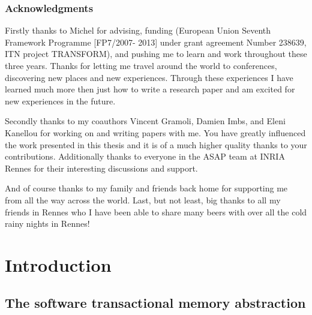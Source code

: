 \documentclass[11pt]{book}
\begin{document}








\newpage

\section*{Acknowledgments}
%
Firstly thanks to Michel for advising, funding
(European Union Seventh Framework Programme [FP7/2007-
2013] under grant agreement Number 238639, ITN project TRANSFORM),
and pushing me to learn and
work throughout these three years.
Thanks for letting me travel around the world to conferences, discovering
new places and new experiences.
Through these experiences I have learned much more then just how to write
a research paper and am excited for new experiences in the future.

Secondly thanks to my coauthors Vincent Gramoli, Damien Imbs, and Eleni
Kanellou for working on and writing papers with me.
You have greatly influenced the work presented in this thesis and it is
of a much higher quality thanks to your contributions.
Additionally thanks to everyone in the ASAP team at INRIA Rennes
for their interesting discussions and support.

And of course thanks to my family and friends back home for supporting me from all the way across the
world.
Last, but not least, big thanks to all my friends in Rennes who I have been able
to share many beers with over all the cold rainy nights in Rennes!


\sloppy

\tableofcontents      	%
\listoffigures        	%
\clearpage




\part{Introduction}

\chapter{The software transactional memory abstraction}
%
%

\end{document}
